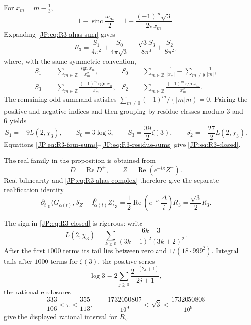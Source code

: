 \documentclass[11pt]{amsart}
\numberwithin{equation}{section}
\theoremstyle{definition}
\theoremstyle{remark}
\begin{document}
For $x_m=m-\frac13$,
\[
 1-\operatorname{sinc}\frac{\omega_m}{2}
 =1+\frac{(-1)^m\sqrt3}{2\pi x_m}.
\]
Expanding \eqref{JP:eq:R3-alias-sum} gives
\begin{equation}\label{JP:eq:R3-four-sums}
 R_3=\frac{S_1}{4\pi^2}
 +\frac{S_0}{4\pi\sqrt3}
 +\frac{\sqrt3S_3}{8\pi^3}
 +\frac{S_2}{8\pi^2},
\end{equation}
where, with the same symmetric convention,
\[
\begin{aligned}
 S_1&=\sum_{m\in\mathbb Z}
 \frac{\operatorname {sgn}x_m}{x_m^2},&
 S_0&=\sum_{m\in\mathbb Z}\frac1{|x_m|}
      -\sum_{m\ne0}\frac1{|m|},\\
 S_3&=\sum_{m\in\mathbb Z}
 \frac{(-1)^m\operatorname {sgn}x_m}{x_m^3},&
 S_2&=\sum_{m\in\mathbb Z}
 \frac{(-1)^m\operatorname {sgn}x_m}{x_m^2}.
\end{aligned}
\]
The remaining odd summand satisfies
$\sum_{m\ne0}(-1)^m/(|m|m)=0$.  Pairing the positive and negative
indices and then grouping by residue classes modulo $3$ and $6$ yields
\begin{equation}\label{JP:eq:R3-residue-sums}
 S_1=-9L(2,\chi_3),\qquad S_0=3\log3,\qquad
 S_3=\frac{39}{2}\zeta(3),\qquad
 S_2=-\frac{27}{2}L(2,\chi_3).
\end{equation}
Equations \eqref{JP:eq:R3-four-sums}--\eqref{JP:eq:R3-residue-sums} give
\eqref{JP:eq:R3-closed}.

The real family in the proposition is obtained from
\[
 D=\operatorname {Re}D^+,\qquad
 Z=\operatorname {Re}(e^{-i\kappa}Z^-).
\]
Real bilinearity and \eqref{JP:eq:R3-alias-complex} therefore give the
separate realification identity
\begin{equation}\label{JP:eq:R3-alias-real}
 \left.\partial_t\right|_0
 \langle G_{\alpha(t)},S_Z-I_{\alpha(t)}^0Z\rangle_3
 =\frac12\operatorname {Re}
 \left(e^{-i\kappa}\frac{\Delta}{i}\right)R_3
 =\frac{\sqrt3}{2}R_3.
\end{equation}

The sign in \eqref{JP:eq:R3-closed} is rigorous: write
\[
 L(2,\chi_3)=\sum_{k\ge0}
 \frac{6k+3}{(3k+1)^2(3k+2)^2}.
\]
After the first $1000$ terms its tail lies between zero and
$1/(18\cdot999^2)$.  Integral tails after $1000$ terms for $\zeta(3)$,
the positive series
\[
\log3=2\sum_{j\ge0}\frac{2^{-(2j+1)}}{2j+1},
\]
the rational enclosures
\[
 \frac{333}{106}<\pi<\frac{355}{113},\qquad
 \frac{1732050807}{10^9}<\sqrt3<\frac{1732050808}{10^9}
\]
give the displayed rational interval for $R_3$.
\end{document}
